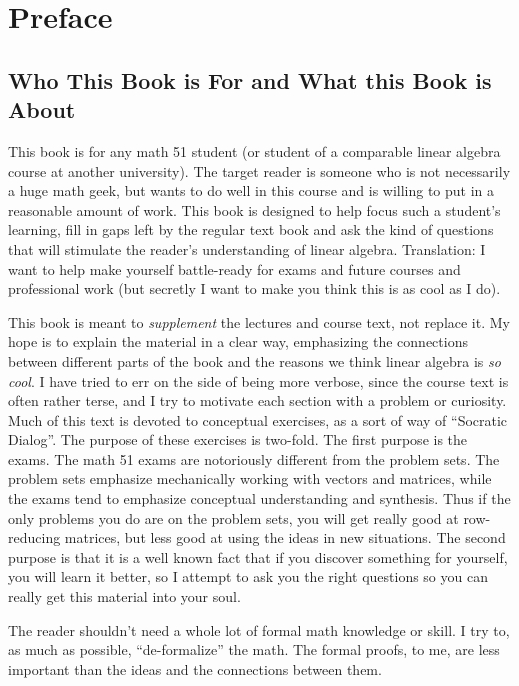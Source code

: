 \section*{Preface}

\subsection*{Who This Book is For and What this Book is About}


This book is for any math 51 student (or student of a comparable linear algebra course at another university).
The target reader is someone who is not necessarily a huge math geek, but wants to do well in this course and is willing to put in a reasonable amount of work. 
This book is designed to help focus such a student's learning, fill in gaps left by the regular text book and ask the kind of questions that will stimulate the reader's understanding of linear algebra.
Translation: I want to help make yourself battle-ready for exams and future courses and professional work (but secretly I want to make you think this is as cool as I do).  

This book is meant to \emph{supplement} the lectures and course text, not replace it.  
My hope is to explain the material in a clear way, emphasizing the connections between different parts of the book and the reasons we think linear algebra is \emph{so cool}.
I have tried to err on the side of being more verbose, since the course text is often rather terse, and I try to motivate each section with a problem or curiosity.
Much of this text is devoted to conceptual exercises, as a sort of way of ``Socratic Dialog''.  
The purpose of these exercises is two-fold.
The first purpose is the exams.
The math 51 exams are notoriously different from the problem sets.
The problem sets emphasize mechanically working with vectors and matrices, while the exams tend to emphasize conceptual understanding and synthesis.
Thus if the only problems you do are on the problem sets, you will get really good at row-reducing matrices, but less good at using the ideas in new situations.  
The second purpose is that it is a well known fact that if you discover something for yourself, you will learn it better, so I attempt to ask you the right questions so you can really get this material into your soul.

The reader shouldn't need a whole lot of formal math knowledge or skill.
I try to, as much as possible, ``de-formalize'' the math.
The formal proofs, to me, are less important than the ideas and the connections between them.

